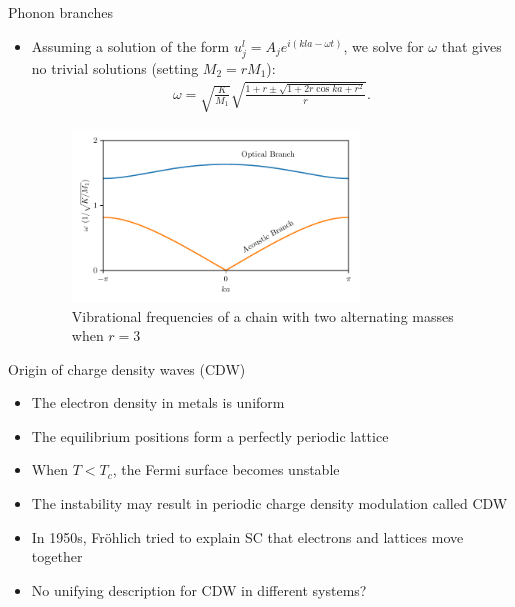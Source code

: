 \documentclass{beamer}
\begin{document}
\begin{frame}{Phonon branches}
\begin{itemize}
\item Assuming a solution of the form $u_j^l = A_j e^{i(kla - \omega t)}$,
we solve for $\omega$ that gives no trivial solutions (setting $M_2 = r M_1$):
\begin{align}
\omega = \sqrt{\frac{K}{M_1}}
\sqrt{\frac{1 + r \pm \sqrt{1 + 2r\cos{ka} + r^2}}{r}}.
\end{align}
\begin{figure}
\includegraphics[width=3in]{figs/1d_dispersion.pdf}
\caption{\label{fig:1d_dispersion} Vibrational frequencies of a chain with two alternating masses when $r = 3$}
\end{figure}
\end{itemize}
\end{frame}

\begin{frame}{Origin of charge density waves (CDW)}
\begin{itemize}
\item The electron density in metals is uniform
\item The equilibrium positions form a perfectly periodic lattice
\item When $T < T_c$, the Fermi surface becomes unstable
\item The instability may result in periodic charge density modulation called CDW
\item In 1950s, Fr\"{o}hlich tried to explain SC that electrons and lattices move together
\item No unifying description for CDW in different systems?
\end{itemize}
\end{frame}
\end{document}
